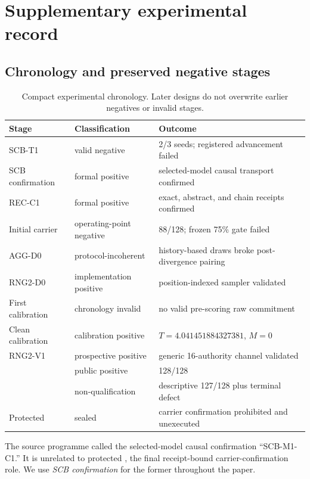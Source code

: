 \section{Supplementary experimental record}

\subsection{Chronology and preserved negative stages}
\begin{table}[H]
\caption{Compact experimental chronology. Later designs do not overwrite earlier negatives or invalid stages.}
\centering
\small
\begin{tabularx}{\linewidth}{@{}lYY@{}}
\toprule
Stage & Classification & Outcome \\
\midrule
SCB-T1 & valid negative & 2/3 seeds; registered advancement failed \\
SCB confirmation & formal positive & selected-model causal transport confirmed \\
REC-C1 & formal positive & exact, abstract, and chain receipts confirmed \\
Initial carrier & operating-point negative & 88/128; frozen 75\% gate failed \\
AGG-D0 & protocol-incoherent & history-based draws broke post-divergence pairing \\
RNG2-D0 & implementation positive & position-indexed sampler validated \\
First calibration & chronology invalid & no valid pre-scoring raw commitment \\
Clean calibration & calibration positive & $T=4.041451884327381$, $M=0$ \\
RNG2-V1 & prospective positive & generic 16-authority channel validated \\
\intvone{} & public positive & 128/128 \\
\intqone{} & non-qualification & descriptive 127/128 plus terminal defect \\
Protected \intcone{} & sealed & carrier confirmation prohibited and unexecuted \\
\bottomrule
\end{tabularx}
\end{table}

The source programme called the selected-model causal confirmation ``SCB-M1-C1.'' It is unrelated to protected \intcone{}, the final receipt-bound carrier-confirmation role. We use \emph{SCB confirmation} for the former throughout the paper.

